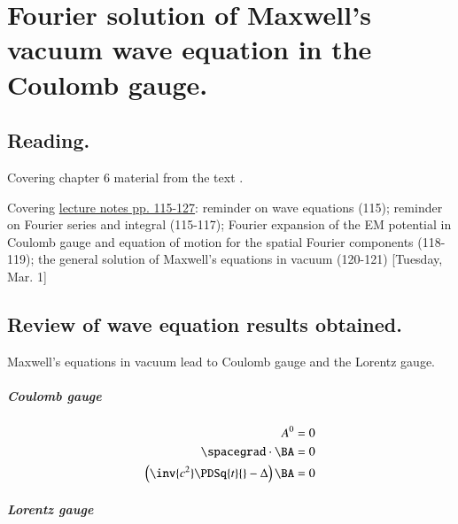 %
%

\chapter{Fourier solution of Maxwell's vacuum wave equation in the Coulomb gauge.}
\label{chap:relativisticElectrodynamicsL15}
{}
\date{Mar 1, 2011}

\beginArtNoToc

\section{Reading.}

Covering chapter 6 material from the text \cite{landau1980classical}.

Covering \href{http://www.physics.utoronto.ca/~poppitz/epoppitz/PHY450_files/RelEMpp115-127.pdf}{lecture notes pp. 115-127}: reminder on wave equations (115); reminder on Fourier series and integral (115-117); Fourier expansion of the EM potential in Coulomb gauge and equation of motion for the spatial Fourier components (118-119); the general solution of Maxwell's equations in vacuum (120-121) [Tuesday, Mar. 1]

\section{Review of wave equation results obtained.}

Maxwell's equations in vacuum lead to Coulomb gauge and the Lorentz gauge.

\paragraph{Coulomb gauge}

\begin{align}\label{eqn:relativisticElectrodynamicsL15:10}
A^0 &= 0 \\
\spacegrad \cdot \BA &= 0 \\
\left( \inv{c^2} \PDSq{t}{} - \Delta \right) \BA &= 0
\end{align}

\paragraph{Lorentz gauge}


